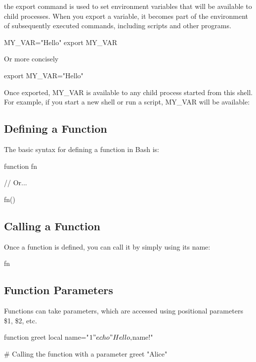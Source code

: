 \documentclass{report}
\begin{document}
    \pagebreak 
    \bigbreak \noindent 
    the export command is used to set environment variables that will be available to child processes. When you export a variable, it becomes part of the environment of subsequently executed commands, including scripts and other programs.
    \bigbreak \noindent 
    \begin{bashcode}
    MY_VAR="Hello"
    export MY_VAR
    \end{bashcode}
    \bigbreak \noindent 
    Or more concisely
    \bigbreak \noindent 
    \begin{bashcode}
    export MY_VAR="Hello"
    \end{bashcode}
    \bigbreak \noindent 
    Once exported, MY\_VAR is available to any child process started from this shell. For example, if you start a new shell or run a script, MY\_VAR will be available:
    \bigbreak \noindent 


    \pagebreak 
    \bigbreak \noindent 
    \subsection{Defining a Function}
    \bigbreak \noindent 
    The basic syntax for defining a function in Bash is:
    \bigbreak \noindent 
    \begin{bashcode}
        function fn {
        }

        // Or...

        fn() {

        }
    \end{bashcode}

    \bigbreak \noindent 
    \subsection{Calling a Function}
    \bigbreak \noindent 
    Once a function is defined, you can call it by simply using its name:
    \bigbreak \noindent 
    \begin{bashcode}
    fn
    \end{bashcode}

    \bigbreak \noindent 
    \subsection{Function Parameters}
    \bigbreak \noindent 
    Functions can take parameters, which are accessed using positional parameters \$1, \$2, etc. 
    \bigbreak \noindent 
    \begin{bashcode}
        function greet {
            local name="$1"
            echo "Hello, $name!"
        }

        # Calling the function with a parameter
        greet "Alice"
    \end{bashcode}
    \bigbreak \noindent 
\end{document}
